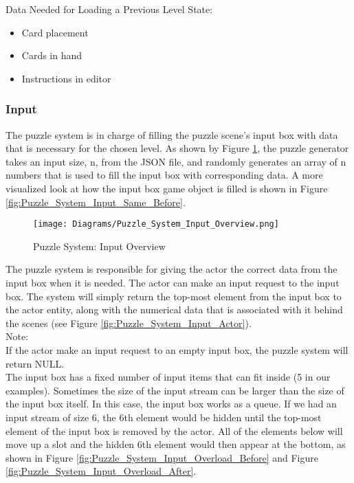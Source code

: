 Data Needed for Loading a Previous Level State:
\begin{itemize}
  \item Card placement
  \item Cards in hand
  \item Instructions in editor
\end{itemize}

\subsubsection{Input}
The puzzle system is in charge of filling the puzzle scene's input box with data
that is necessary for the chosen level. As shown by Figure \ref{fig:Puzzle_System_Input_Overview}, the puzzle generator
takes an input size, n, from the JSON file, and randomly generates an array of n
numbers that is used to fill the input box with corresponding data. A more visualized
look at how the input box game object is filled is shown in Figure \ref{fig:Puzzle_System_Input_Same_Before}.\\

\begin{figure}[!hb]
  \caption{Puzzle System: Input Overview}
  \label{fig:Puzzle_System_Input_Overview}
  \centering
  \texttt{[image: Diagrams/Puzzle\_System\_Input\_Overview.png]}
\end{figure}

The puzzle system is responsible for giving the actor the correct data from the
input box when it is needed. The actor can make an input request to the input box.
The system will simply return the top-most element from the input box to the actor entity, along with the
numerical data that is associated with it behind the scenes (see Figure \ref{fig:Puzzle_System_Input_Actor}).\\

Note:\\

If the actor make an input request to an empty input box, the puzzle system
will return NULL.\\

The input box has a fixed number of input items that can fit inside (5 in our examples).
Sometimes the size of the input stream can be larger than the size of the input box
itself. In this case, the input box works as a queue. If we had an input stream of
size 6, the 6th element would be hidden until the top-most element of the input box
is removed by the actor. All of the elements below will move up a slot and the
hidden 6th element would then appear at the bottom, as shown in Figure \ref{fig:Puzzle_System_Input_Overload_Before} and
Figure \ref{fig:Puzzle_System_Input_Overload_After}.\\


